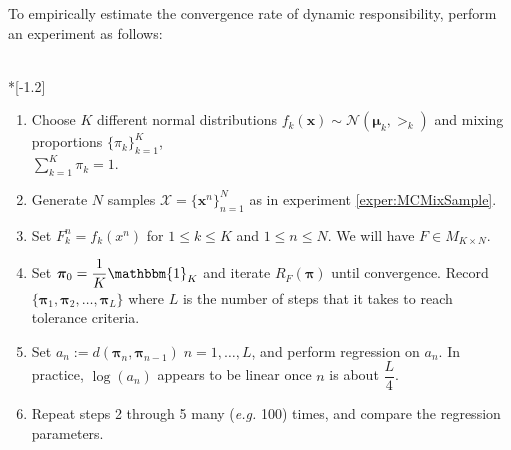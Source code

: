 To empirically estimate the convergence rate of dynamic responsibility, perform an experiment as follows:
\begin{experiment}\label{exper:conv}
	\ \\*[-1.2\baselineskip]
	\begin{enumerate}
		\item Choose \( K \) different normal distributions \( f_k(\bm x) \sim \mathcal{N}(\bm\mu_k,\bm\gt_k) \)
		and mixing proportions \( \{\pi_k\}_{k=1}^{K}\), \\\( \sum_{k=1}^{K}\pi_k =1 \).
		\item Generate \( N \) samples $\mathcal{X}=\{\bm x^n\}_{n=1}^{N}$ as in experiment \ref{exper:MCMixSample}.
		\item Set \( F_{k}^{n} = f_k(x^n) \) for \( 1\leq k\leq K \) and \( 1\leq n\leq N \). We will have \( F\in M_{K\times N} \).
		\item Set \( \bm\pi_0 = \dfrac{1}{K}\mathbbm{1}_K \) and iterate \( R_F(\bm\pi) \) until convergence.  Record \( \{\bm\pi_1,\bm\pi_2,\ldots, \bm\pi_L\} \) where \( L \) is the number of steps that it takes to reach tolerance criteria.
		\item Set \( a_{n} := d(\bm\pi_n, \bm\pi_{n-1})\; n=1,\ldots,L \), and perform regression on \( a_n \).  In practice, \( \log(a_n) \) appears to be linear once \( n \) is about \( \dfrac{L}{4} \).
		\item Repeat steps 2 through 5 many (\textit{e.g.} 100) times, and compare the regression parameters.
		
	\end{enumerate}
\end{experiment}

